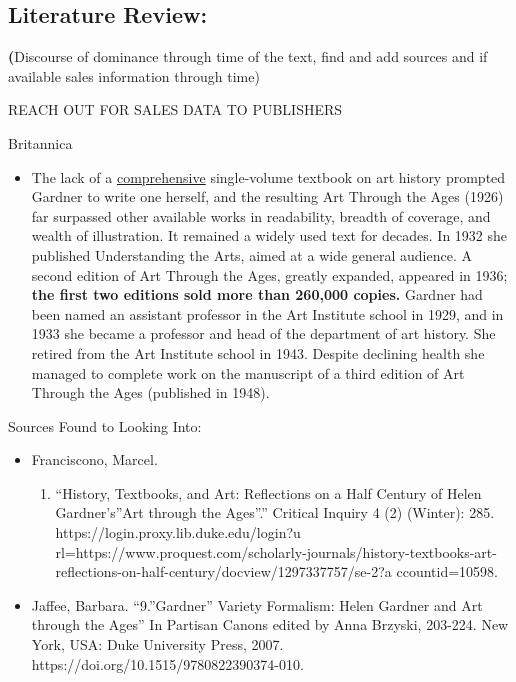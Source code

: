 \documentclass[
  letterpaper,
  DIV=11,
  numbers=noendperiod]{scrreprt}
\providecommand{\tightlist}{%
  \setlength{\itemsep}{0pt}\setlength{\parskip}{0pt}}
\begin{document}
\hypertarget{literature-review}{%
\subsection{Literature Review:}\label{literature-review}}

\textbf{(}Discourse of dominance through time of the text, find and add
sources and if available sales information through time)

REACH OUT FOR SALES DATA TO PUBLISHERS

Britannica

\begin{itemize}
\tightlist
\item
  The lack of a
  \href{https://www.merriam-webster.com/dictionary/comprehensive}{comprehensive}
  single-volume textbook on art history prompted Gardner to write one
  herself, and the resulting Art Through the Ages (1926) far surpassed
  other available works in readability, breadth of coverage, and wealth
  of illustration. It remained a widely used text for decades. In 1932
  she published Understanding the Arts, aimed at a wide general
  audience. A second edition of Art Through the Ages, greatly expanded,
  appeared in 1936; \textbf{the first two editions sold more than
  260,000 copies.} Gardner had been named an assistant professor in the
  Art Institute school in 1929, and in 1933 she became a professor and
  head of the department of art history. She retired from the Art
  Institute school in 1943. Despite declining health she managed to
  complete work on the manuscript of a third edition of Art Through the
  Ages (published in 1948).
\end{itemize}

Sources Found to Looking Into:

\begin{itemize}
\tightlist
\item
  Franciscono, Marcel.

  \begin{enumerate}
  \def\labelenumi{\arabic{enumi}.}
  \setcounter{enumi}{1976}
  \tightlist
  \item
    ``History, Textbooks, and Art: Reflections on a Half Century of
    Helen Gardner's''Art through the Ages''.'' Critical Inquiry 4 (2)
    (Winter): 285. https://login.proxy.lib.duke.edu/login?u
    rl=https://www.proquest.com/scholarly-journals/history-textbooks-art-reflections-on-half-century/docview/1297337757/se-2?a
    ccountid=10598.
  \end{enumerate}
\item
  Jaffee, Barbara. ``9.''Gardner'' Variety Formalism: Helen Gardner and
  Art through the Ages'' In Partisan Canons edited by Anna Brzyski,
  203-224. New York, USA: Duke University Press, 2007.
  https://doi.org/10.1515/9780822390374-010.
\end{itemize}
\end{document}

